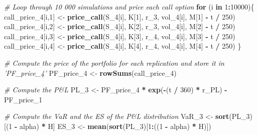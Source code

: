 \documentclass[]{article}
\newenvironment{Shaded}{\begin{snugshade}}{\end{snugshade}}
\newcommand{\CommentTok}[1]{\textcolor[rgb]{0.56,0.35,0.01}{\textit{#1}}}
\newcommand{\ControlFlowTok}[1]{\textcolor[rgb]{0.13,0.29,0.53}{\textbf{#1}}}
\newcommand{\DecValTok}[1]{\textcolor[rgb]{0.00,0.00,0.81}{#1}}
\newcommand{\KeywordTok}[1]{\textcolor[rgb]{0.13,0.29,0.53}{\textbf{#1}}}
\newcommand{\NormalTok}[1]{#1}
\newcommand{\OperatorTok}[1]{\textcolor[rgb]{0.81,0.36,0.00}{\textbf{#1}}}
\newcommand{\StringTok}[1]{\textcolor[rgb]{0.31,0.60,0.02}{#1}}
\begin{document}
\begin{Shaded}
\begin{Highlighting}[]
\CommentTok{# Loop through 10 000 simulations and price each call option}
\ControlFlowTok{for}\NormalTok{ (i }\ControlFlowTok{in} \DecValTok{1}\OperatorTok{:}\DecValTok{10000}\NormalTok{)\{}
\NormalTok{  call_price_}\DecValTok{4}\NormalTok{[i,}\DecValTok{1}\NormalTok{] <-}\StringTok{ }\KeywordTok{price_call}\NormalTok{(S_}\DecValTok{4}\NormalTok{[i], K[}\DecValTok{1}\NormalTok{], r_}\DecValTok{3}\NormalTok{, vol_}\DecValTok{4}\NormalTok{[i], M[}\DecValTok{1}\NormalTok{] }\OperatorTok{-}\StringTok{ }\NormalTok{t }\OperatorTok{/}\StringTok{ }\DecValTok{250}\NormalTok{)}
\NormalTok{  call_price_}\DecValTok{4}\NormalTok{[i,}\DecValTok{2}\NormalTok{] <-}\StringTok{ }\KeywordTok{price_call}\NormalTok{(S_}\DecValTok{4}\NormalTok{[i], K[}\DecValTok{2}\NormalTok{], r_}\DecValTok{3}\NormalTok{, vol_}\DecValTok{4}\NormalTok{[i], M[}\DecValTok{2}\NormalTok{] }\OperatorTok{-}\StringTok{ }\NormalTok{t }\OperatorTok{/}\StringTok{ }\DecValTok{250}\NormalTok{)}
\NormalTok{  call_price_}\DecValTok{4}\NormalTok{[i,}\DecValTok{3}\NormalTok{] <-}\StringTok{ }\KeywordTok{price_call}\NormalTok{(S_}\DecValTok{4}\NormalTok{[i], K[}\DecValTok{3}\NormalTok{], r_}\DecValTok{4}\NormalTok{, vol_}\DecValTok{4}\NormalTok{[i], M[}\DecValTok{3}\NormalTok{] }\OperatorTok{-}\StringTok{ }\NormalTok{t }\OperatorTok{/}\StringTok{ }\DecValTok{250}\NormalTok{)}
\NormalTok{  call_price_}\DecValTok{4}\NormalTok{[i,}\DecValTok{4}\NormalTok{] <-}\StringTok{ }\KeywordTok{price_call}\NormalTok{(S_}\DecValTok{4}\NormalTok{[i], K[}\DecValTok{4}\NormalTok{], r_}\DecValTok{4}\NormalTok{, vol_}\DecValTok{4}\NormalTok{[i], M[}\DecValTok{4}\NormalTok{] }\OperatorTok{-}\StringTok{ }\NormalTok{t }\OperatorTok{/}\StringTok{ }\DecValTok{250}\NormalTok{)}
\NormalTok{\}}

\CommentTok{# Compute the price of the portfolio for each replication and store it in 'PF_price_4'}
\NormalTok{PF_price_}\DecValTok{4}\NormalTok{ <-}\StringTok{ }\KeywordTok{rowSums}\NormalTok{(call_price_}\DecValTok{4}\NormalTok{)}

\CommentTok{# Compute the P&L}
\NormalTok{PL_}\DecValTok{3}\NormalTok{ <-}\StringTok{ }\NormalTok{PF_price_}\DecValTok{4} \OperatorTok{*}\StringTok{ }\KeywordTok{exp}\NormalTok{(}\OperatorTok{-}\NormalTok{(t }\OperatorTok{/}\StringTok{ }\DecValTok{360}\NormalTok{) }\OperatorTok{*}\StringTok{ }\NormalTok{r_PL) }\OperatorTok{-}\StringTok{ }\NormalTok{PF_price_}\DecValTok{1}

\CommentTok{# Compute the VaR and the ES of the P&L distribution}
\NormalTok{VaR_}\DecValTok{3}\NormalTok{ <-}\StringTok{ }\KeywordTok{sort}\NormalTok{(PL_}\DecValTok{3}\NormalTok{)[(}\DecValTok{1} \OperatorTok{-}\StringTok{ }\NormalTok{alpha) }\OperatorTok{*}\StringTok{ }\NormalTok{H]}
\NormalTok{ES_}\DecValTok{3}\NormalTok{  <-}\StringTok{ }\KeywordTok{mean}\NormalTok{(}\KeywordTok{sort}\NormalTok{(PL_}\DecValTok{3}\NormalTok{)[}\DecValTok{1}\OperatorTok{:}\NormalTok{((}\DecValTok{1} \OperatorTok{-}\StringTok{ }\NormalTok{alpha) }\OperatorTok{*}\StringTok{ }\NormalTok{H)])}


\end{Highlighting}
\end{Shaded}
\end{document}

